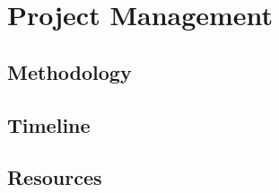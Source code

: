 \chapter{Project Management}
\label{ch:project managment}

\section{Methodology}

\section{Timeline}

\section{Resources}
